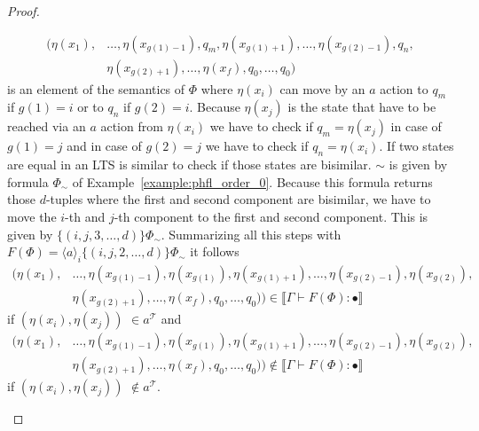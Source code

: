 \begin{proof}
\begin{compactitem}
\begin{align*}
            (\eta(x_1),& \dots, \eta(x_{g(1) - 1}), q_m, \eta(x_{g(1)+1}), \dots, \eta(x_{g(2)-1}), q_n,\\& \eta(x_{g(2)
            +1}), \dots, \eta(x_f), q_0, \dots, q_0)
        \end{align*}
        is an element of the semantics of $\Phi$ where $\eta(x_i)$ can
        move by an $a$ action to $q_m$ if $g(1) = i$ or to $q_n$ if $g(2) = i$. Because $\eta(x_j)$ is the state that
        have to be reached via an $a$ action from $\eta(x_i)$ we have to check if $q_m = \eta(x_j)$ in case of $g(1)
        = j$ and in case of $g(2) = j$ we have to check if $q_n = \eta(x_i)$. If two states are equal in an LTS is
        similar to check if those states are bisimilar. $\sim$ is given by formula $\Phi_\sim$ of
        Example~\ref{example:phfl_order_0}.
        Because this formula returns those $d$-tuples where the first and second component are bisimilar, we have to
        move the $i$-th and $j$-th component to the first and second component. This is given by $\{(i, j, 3, \dots, d
        )\} \Phi_\sim$. Summarizing all this steps with $F(\Phi) = \langle a \rangle_i \{(i, j, 2, \dots, d)\}
        \Phi_\sim$ it follows
        \begin{align*}
            (\eta(x_1),& \dots, \eta(x_{g(1) - 1}), \eta(x_{g(1)}), \eta(x_{g(1)+1}), \dots, \eta(x_{g(2)-1}), \eta
            (x_{g(2)}),\\& \eta(x_{g(2)+1}), \dots, \eta(x_f), q_0, \dots, q_0)) \in \llbracket \Gamma \vdash F(\Phi)
            \colon \bullet \rrbracket
        \end{align*}
        if $(\eta(x_i), \eta(x_j))$ $ \in a^\mathcal{T}$ and
        \begin{align*}
            (\eta(x_1),& \dots, \eta(x_{g(1) - 1}), \eta(x_{g(1)}), \eta(x_{g(1)+1}), \dots, \eta(x_{g(2)-1}), \eta
            (x_{g(2)}),\\& \eta(x_{g(2)+1}), \dots, \eta(x_f), q_0, \dots, q_0)) \not\in \llbracket \Gamma \vdash
            F(\Phi) \colon \bullet \rrbracket
        \end{align*}
        if $(\eta(x_i), \eta(x_j))$ $ \not\in a^\mathcal{T}$.


\end{compactitem}
\end{proof}
